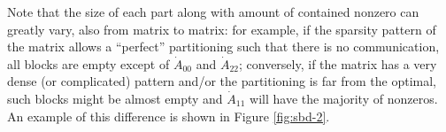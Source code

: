 Note that the size of each part along with amount of contained nonzero can greatly vary, also from matrix to matrix: for example, if the sparsity pattern of the matrix allows a ``perfect'' partitioning such that there is no communication, all blocks are empty except of $\dot{A}_{00}$ and $\dot{A}_{22}$; conversely, if the matrix has a very dense (or complicated) pattern and/or the partitioning is far from the optimal, such blocks might be almost empty and $\dot{A}_{11}$ will have the majority of nonzeros. An example of this difference is shown in Figure \ref{fig:sbd-2}.

\begin{figure}[h]
	\centering
	 \hspace{1cm}

\end{figure}
